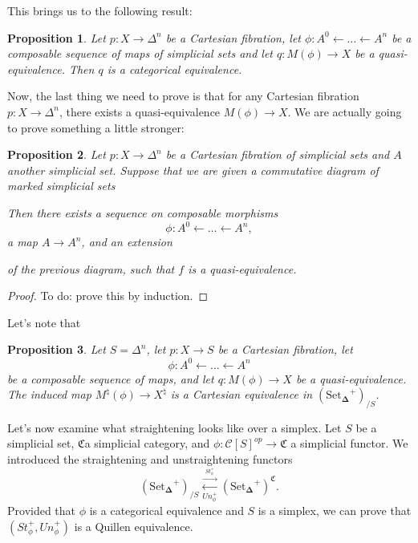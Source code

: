 \documentclass[12pt]{amsart}
\newcommand{\8}{\ensuremath{\infty}}
\newcommand{\C}{\ensuremath{\mathfrak{C}}}
\newcommand{\SSet}{\ensuremath{\text{Set}_{\boldsymbol{\Delta}}}}
\newcommand{\adj}[2]{\ensuremath{\overset{\overset{#1}{ \rightarrow}}{\underset{#2}{\leftarrow}}}}
\newtheorem{proposition}{Proposition}
\begin{document}
{{This brings us to the following result:
\begin{proposition}
  Let $p:X\rightarrow \Delta^n$ be a Cartesian fibration, let $\phi:A^0\leftarrow\dots\leftarrow A^n$ be a composable sequence of maps of simplicial sets and let $q:M(\phi)\rightarrow X$ be a quasi-equivalence. Then $q$ is a categorical equivalence.
\end{proposition}

Now, the last thing we need to prove is that for any Cartesian fibration $p:X\rightarrow \Delta^n$, there exists a quasi-equivalence $M(\phi)\rightarrow X$. We are actually going to prove something a little stronger:

\begin{proposition}
  Let $p:X\rightarrow \Delta^n$ be a Cartesian fibration of simplicial sets and $A$ another simplicial set. Suppose that we are given a commutative diagram of marked simplicial sets 
  Then there exists a sequence on composable morphisms \[\phi:A^0\leftarrow\dots\leftarrow A^n,\]
  a map $A\rightarrow A^n$, and an extension
  of the previous diagram, such that $f$ is a quasi-equivalence.
\end{proposition}

\begin{proof}
  To do: prove this by induction.
\end{proof}

Let's note that
\begin{proposition}
  Let $S=\Delta^n$, let $p:X\rightarrow S$ be a Cartesian fibration, let \[\phi:A^0\leftarrow\dots\leftarrow A^n\] be a composable sequence of maps, and let $q:M(\phi)\rightarrow X$ be a quasi-equivalence. The induced map $M^\natural(\phi)\rightarrow X^\natural$ is a Cartesian equivalence in $(\SSet^+)_{/S}$.
\end{proposition}

Let's now examine what straightening looks like over a simplex. Let $S$ be a simplicial set, \C a simplicial category, and $\phi:\mathscr{C}[S]^{op}\rightarrow \C$ a simplicial functor. We introduced the straightening and unstraightening functors
\[(\SSet^+)_{/S}\adj{St^+_\phi}{Un^+_\phi} (\SSet^+)^\C.\]
Provided that $\phi$ is a categorical equivalence and $S$ is a simplex, we can prove that $(St^+_\phi, Un^+_\phi)$ is a Quillen equivalence.  

}}
\end{document}
